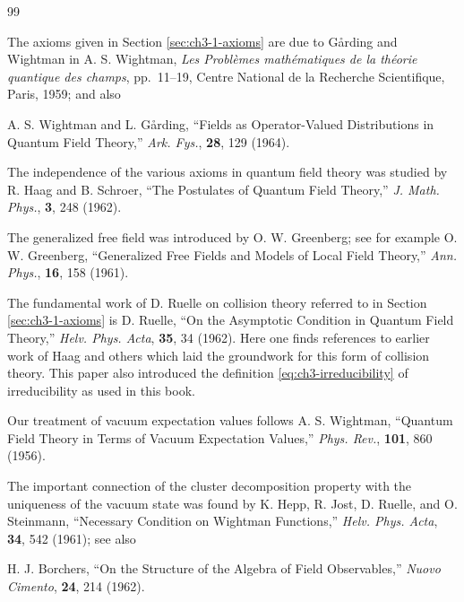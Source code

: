 \chapterbibliography

\small
\begin{thebibliography}{99}

\item[]
The axioms given in Section \ref{sec:ch3-1-axioms} are due to Gårding and Wightman in
 A. S. Wightman, \emph{Les Problèmes mathématiques de la théorie
quantique des champs}, pp.~11--19, Centre National de la Recherche
Scientifique, Paris, 1959; and also

 A. S. Wightman and L. Gårding, ``Fields as Operator-Valued
Distributions in Quantum Field Theory,'' \emph{Ark. Fys.}, \textbf{28}, 129
(1964).

\item[]
The independence of the various axioms in quantum field theory was studied by
 R. Haag and B. Schroer, ``The Postulates of Quantum Field Theory,''
\emph{J. Math. Phys.}, \textbf{3}, 248 (1962).

\item[]
The generalized free field was introduced by O. W. Greenberg; see for example
 O. W. Greenberg, ``Generalized Free Fields and Models of Local
Field Theory,'' \emph{Ann. Phys.}, \textbf{16}, 158 (1961).

\item[]
The fundamental work of D. Ruelle on collision theory referred to in
Section \ref{sec:ch3-1-axioms} is
 D. Ruelle, ``On the Asymptotic Condition in Quantum Field Theory,''
\emph{Helv. Phys. Acta}, \textbf{35}, 34 (1962).  Here one finds references
to earlier work of Haag and others which laid the groundwork for this form of
collision theory.  This paper also introduced the definition \eqref{eq:ch3-irreducibility} of
irreducibility as used in this book.

\item[]
Our treatment of vacuum expectation values follows
 A. S. Wightman, ``Quantum Field Theory in Terms of Vacuum
Expectation Values,'' \emph{Phys. Rev.}, \textbf{101}, 860 (1956).

\item[]
The important connection of the cluster decomposition property with the
uniqueness of the vacuum state was found by
 K. Hepp, R. Jost, D. Ruelle, and O. Steinmann, ``Necessary
Condition on Wightman Functions,'' \emph{Helv. Phys. Acta}, \textbf{34}, 542
(1961); see also

 H. J. Borchers, ``On the Structure of the Algebra of Field
Observables,'' \emph{Nuovo Cimento}, \textbf{24}, 214 (1962).


\end{thebibliography}
